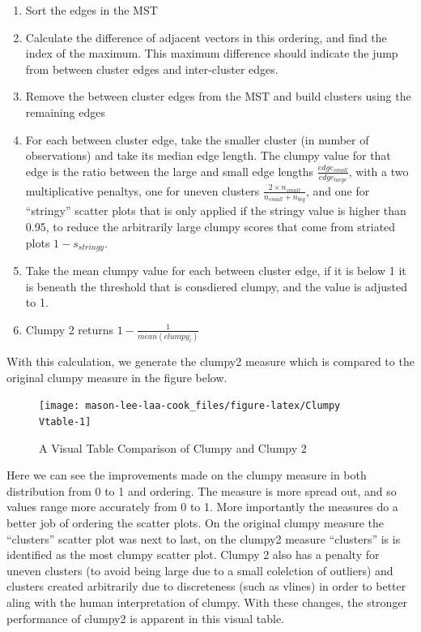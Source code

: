 \begin{enumerate}
\def\labelenumi{\arabic{enumi}.}
\tightlist
\item
  Sort the edges in the MST
\item
  Calculate the difference of adjacent vectors in this ordering, and
  find the index of the maximum. This maximum difference should indicate
  the jump from between cluster edges and inter-cluster edges.
\item
  Remove the between cluster edges from the MST and build clusters using
  the remaining edges
\item
  For each between cluster edge, take the smaller cluster (in number of
  observations) and take its median edge length. The clumpy value for
  that edge is the ratio between the large and small edge lengths
  \(\frac{edge_{small}}{edge_{large}}\), with a two multiplicative
  penaltys, one for uneven clusters
  \(\frac{2\times n_{small}}{n_{small}+n_{big}}\), and one for
  ``stringy'' scatter plots that is only applied if the stringy value is
  higher than 0.95, to reduce the arbitrarily large clumpy scores that
  come from striated plots \(1-s_{stringy}\).
\item
  Take the mean clumpy value for each between cluster edge, if it is
  below 1 it is beneath the threshold that is consdiered clumpy, and the
  value is adjusted to 1.
\item
  Clumpy 2 returns \(1-\frac{1}{mean(clumpy_i)}\)
\end{enumerate}

With this calculation, we generate the clumpy2 measure which is compared
to the original clumpy measure in the figure below.

\begin{Schunk}
\begin{figure}
\texttt{[image: mason-lee-laa-cook\_files/figure-latex/Clumpy Vtable-1]} \caption[A Visual Table Comparison of Clumpy and Clumpy 2]{A Visual Table Comparison of Clumpy and Clumpy 2}\label{fig:Clumpy Vtable}
\end{figure}
\end{Schunk}

Here we can see the improvements made on the clumpy measure in both
distribution from 0 to 1 and ordering. The measure is more spread out,
and so values range more accurately from 0 to 1. More importantly the
measures do a better job of ordering the scatter plots. On the original
clumpy measure the ``clusters'' scatter plot was next to last, on the
clumpy2 measure ``clusters'' is is identified as the most clumpy scatter
plot. Clumpy 2 also has a penalty for uneven clusters (to avoid being
large due to a small colelction of outliers) and clusters created
arbitrarily due to discreteness (such as vlines) in order to better
aling with the human interpretation of clumpy. With these changes, the
stronger performance of clumpy2 is apparent in this visual table.

